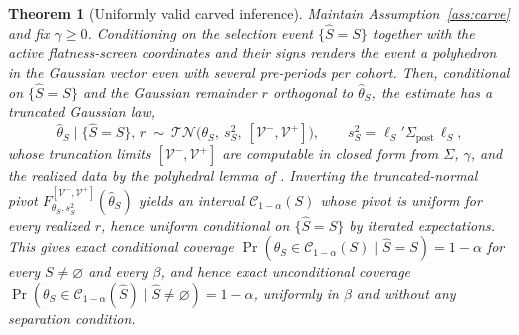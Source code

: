 \documentclass[12pt]{article}
\newtheorem{theorem}{Theorem}
\theoremstyle{remark}
\begin{document}
\begin{theorem}[Uniformly valid carved inference]\label{thm:carve}
Maintain Assumption~\ref{ass:carve} and fix $\gamma\ge0$. Conditioning on the selection event $\{\hat S=S\}$
together with the active flatness-screen coordinates and their signs renders the event a polyhedron in the
Gaussian vector even with several pre-periods per cohort. Then, conditional on $\{\hat S=S\}$ and the
Gaussian remainder $r$ orthogonal to $\hat\theta_S$, the estimate has a truncated Gaussian law,
\[
\hat\theta_S\mid\{\hat S=S\},\,r\ \sim\ \mathcal{TN}\big(\theta_S,\ s_S^2,\ [\mathcal V^-,\mathcal V^+]\big),
\qquad s_S^2=\ell_S'\Sigma_{\mathrm{post}}\,\ell_S,
\]
whose truncation limits $[\mathcal V^-,\mathcal V^+]$ are computable in closed form from $\Sigma$, $\gamma$,
and the realized data by the polyhedral lemma of \citet{lee2016}. Inverting the
truncated-normal pivot $F_{\theta_S,s_S^2}^{[\mathcal V^-,\mathcal V^+]}(\hat\theta_S)$ yields an interval
$\mathcal C_{1-\alpha}(S)$ whose pivot is uniform for every realized $r$, hence uniform conditional on
$\{\hat S=S\}$ by iterated expectations. This gives exact conditional coverage
$\Pr(\theta_S\in\mathcal C_{1-\alpha}(S)\mid\hat S=S)=1-\alpha$ for every $S\neq\varnothing$ and every
$\beta$, and hence exact unconditional coverage $\Pr(\theta_S\in\mathcal C_{1-\alpha}(\hat S)\mid\hat
S\neq\varnothing)=1-\alpha$, uniformly in $\beta$ and without any separation condition.
\end{theorem}
\end{document}
